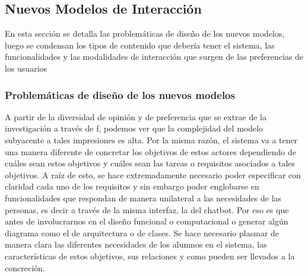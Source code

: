     \subsection{Nuevos Modelos de Interacción}
        \par En esta sección se detalla las problemáticas de diseño de los nuevos modelos, luego se condensan los tipos de contenido que debería tener el sistema, las funcionalidades y las modalidades de interacción que surgen de las preferencias de los usuarios

        \subsubsection{Problemáticas de diseño de los nuevos modelos}
        \par A partir de la diversidad de opinión y de preferencia que se extrae de la investigación a través de \acrlong{f}, podemos ver que la complejidad del modelo subyacente a tales impresiones es alta. Por la misma razón, el sistema va a tener una manera diferente de concretar los objetivos de estos actores dependiendo de cuáles sean estos objetivos y cuáles sean las tareas o requisitos asociados a tales objetivos. A raíz de esto, se hace extremadamente necesario poder especificar con claridad cada uno de los requisitos y sin embargo poder englobarse en funcionalidades que respondan de manera unilateral a las necesidades de las personas, es decir a través de la misma interfaz, la del chatbot. Por eso es que antes de involucrarnos en el diseño funcional o computacional o generar algún diagrama como el de arquitectura o de clases. Se hace necesario plasmar de manera clara las diferentes necesidades de los alumnos en el sistema, las características de estos objetivos, sus relaciones y como pueden ser llevados a la concreción.
        
